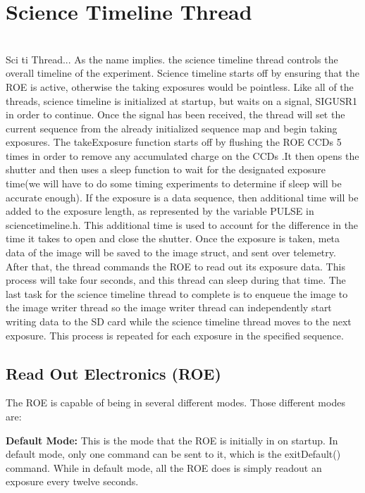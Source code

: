 %
\section{Science Timeline Thread}
\hrulefill
\\
Sci ti Thread...
As the name implies. the science timeline thread controls the overall timeline of the experiment. Science timeline starts off by ensuring that the ROE is active, otherwise the taking exposures would be pointless. Like all of the threads, science timeline is initialized at startup, but waits on a signal, SIGUSR1 in order to continue. Once the signal has been received, the thread will set the current sequence from the already initialized sequence map and begin taking exposures. The takeExposure function starts off by flushing the ROE CCDs 5 times in order to remove any accumulated charge on the CCDs .It then opens the shutter and then uses a sleep function to wait for the designated exposure time(we will have to do some timing experiments to determine if sleep will be accurate enough). If the exposure is a data sequence, then additional time will be added to the exposure length, as represented by the variable PULSE in sciencetimeline.h. This additional time is used to account for the difference in the time it takes to open and close the shutter. 
Once the exposure is taken, meta data of the image will be saved to the image struct, and sent over telemetry. After that, the thread commands the ROE to read out its exposure data. This process will take four seconds, and this thread can sleep during that time. The last task for the science timeline thread to complete is to enqueue the image to the image writer thread so the image writer thread can independently start writing data to the SD card while the science timeline thread moves to the next exposure. 
This process is repeated for each exposure in the specified sequence.

\subsection{Read Out Electronics (ROE)}

The ROE is capable of being in several different modes. Those different modes are:

\textbf{Default Mode:}
This is the mode that the ROE is initially in on startup. In default mode, only one command can be sent to it, which is the exitDefault() command. While in default mode, all the ROE does is simply readout an exposure every twelve seconds.

